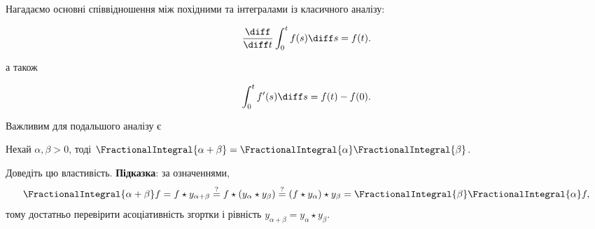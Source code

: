 Нагадаємо основні співвідношення між похідними та інтегралами із класичного аналізу:
\begin{proposition}
    \begin{equation}
        \frac{\diff}{\diff t} \int_0^t f(s) \diff s = f(t).
    \end{equation}
\end{proposition}
а також
\begin{proposition}
    \begin{equation}
        \int_0^t f'(s) \diff s = f(t) - f(0).
    \end{equation}
\end{proposition}

Важливим для подальшого аналізу є
\begin{proposition}
    Нехай $\alpha, \beta > 0$, тоді $\FractionalIntegral{\alpha + \beta} = \FractionalIntegral{\alpha} \FractionalIntegral{\beta}$.
\end{proposition}
\begin{exercise}
    Доведіть цю властивість. \textbf{Підказка}: за означеннями,
    \begin{equation}
        \FractionalIntegral{\alpha + \beta} f = f \star y_{\alpha + \beta} \overset{?}{=} f \star (y_\alpha \star y_\beta) \overset{?}{=} (f \star y_\alpha) \star y_\beta = \FractionalIntegral{\beta} \FractionalIntegral{\alpha} f,
    \end{equation}
    тому достатньо перевірити асоціативність згортки і рівність $y_{\alpha + \beta} = y_\alpha \star y_\beta$.
\end{exercise}
